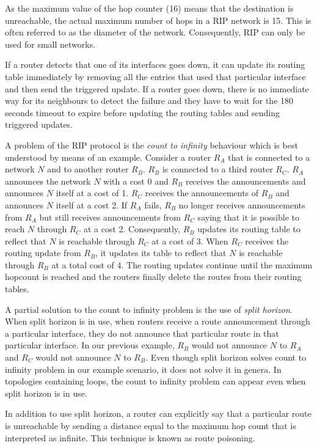 As the maximum value of the hop counter (16) means that the destination is unreachable, the actual maximum number of hops in a RIP network is 15.
This is often referred to as the diameter of the network.
Consequently, RIP can only be used for small networks.

If a router detects that one of its interfaces goes down, it can update its routing table immediately by removing all the entries that used that particular interface and then send the triggered update.
If a router goes down, there is no immediate way for its neighbours to detect the failure and they have to wait for the 180 seconds timeout to expire before updating the routing tables and sending triggered updates.

A problem of the RIP protocol is the \emph{count to infinity} behaviour which is best understood by means of an example.
Consider a router $R_A$ that is connected to a network $N$ and to another router $R_B$.
$R_B$ is connected to a third router $R_C$.
$R_A$ announces the network $N$ with a cost 0 and $R_B$ receives the announcements and announces $N$ itself at a cost of 1.
$R_C$ receives the announcements of $R_B$ and announces $N$ itself at a cost 2.
If $R_A$ fails, $R_B$ no longer receives announcements from $R_A$ but still receives announcements from $R_C$ saying that it is possible to reach $N$ through $R_C$ at a cost 2.
Consequently, $R_B$ updates its routing table to reflect that $N$ is reachable through $R_C$ at a cost of 3.
When $R_C$ receives the routing update from $R_B$, it updates its table to reflect that $N$ is reachable through $R_B$ at a total cost of 4.
The routing updates continue until the maximum hopcount is reached and the routers finally delete the routes from their routing tables.

A partial solution to the count to infinity problem is the use of \emph{split horizon}.
When split horizon is in use, when routers receive a route announcement through a particular interface, they do not announce that particular route in that particular interface.
In our previous example, $R_B$ would not announce $N$ to $R_A$ and $R_C$ would not announce $N$ to $R_B$.
Even though split horizon solves count to infinity problem in our example scenario, it does not solve it in genera.
In topologies containing loops, the count to infinity problem can appear even when split horizon is in use.

In addition to use split horizon, a router can explicitly say that a particular route is unreachable by sending a distance equal to the maximum hop count that is interpreted as infinite.
This technique is known as route poisoning.

